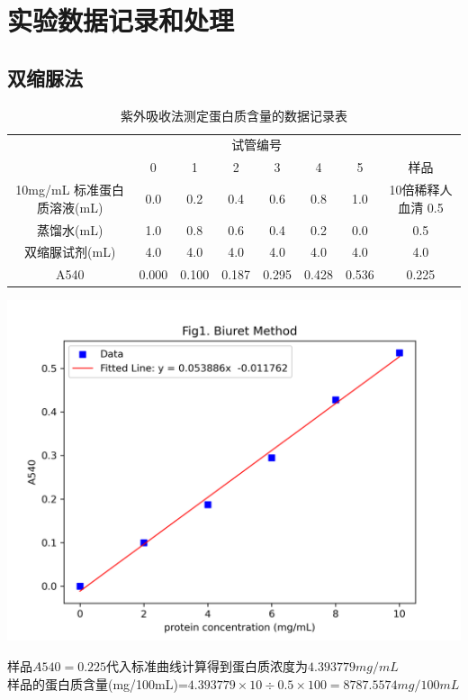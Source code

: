 \documentclass[UTF8]{ctexart}
\begin{document}
\section{实验数据记录和处理}

\subsection{双缩脲法}


\begin{table}[H]
    \centering
    \caption{紫外吸收法测定蛋白质含量的数据记录表}
    \begin{tabular}{cccccccc}
    \toprule
    & \multicolumn{6}{c}{试管编号} \\
    \cmidrule{2-7} 
    & 0 & 1 & 2 & 3 & 4 & 5 & 样品 \\
    \midrule
    10mg/mL 标准蛋白质溶液(mL) & 0.0 & 0.2 & 0.4 & 0.6 & 0.8 & 1.0 & 10倍稀释人血清 0.5 \\
    蒸馏水(mL) & 1.0 & 0.8 & 0.6 & 0.4 & 0.2 & 0.0 & 0.5 \\
    双缩脲试剂(mL) & 4.0 & 4.0 & 4.0 & 4.0 & 4.0 & 4.0 & 4.0\\
    A540 & 0.000 & 0.100 & 0.187 & 0.295 & 0.428 & 0.536 & 0.225 \\
    \bottomrule
    \end{tabular}
\end{table}



\includegraphics{A540.png}

样品$A540=0.225$代入标准曲线计算得到蛋白质浓度为$4.393779mg/mL$\\
样品的蛋白质含量(mg/100mL)=$4.393779\times 10 \div 0.5 \times 100 =8787.5574mg/100mL$
\end{document}
